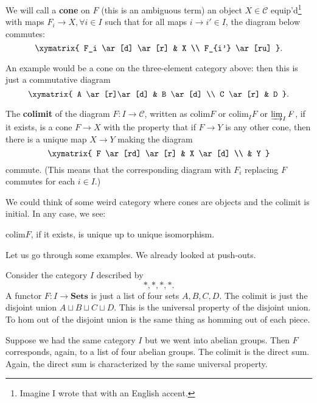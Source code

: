 We will call a \textbf{cone} on $F$ (this is an ambiguous term) an object $X
\in \mathcal{C}$ equip'd\footnote{Imagine I wrote that with an English
accent.} with maps $F_i \to X, \forall i \in I$ such that for all maps $i \to
i' \in I$, the diagram below commutes: \[ \xymatrix{ F_i \ar[d] \ar[r] & X \\
F_{i'} \ar[ru] }.\]

An example would be a cone on the three-element category above: then this is
just a commutative diagram \[ \xymatrix{ A \ar[r]\ar[d] & B \ar[d] \\ C \ar[r]
& D }.\]

\newcommand{\colim}{\mathrm{colim}}

\begin{definition} The \textbf{colimit} of the diagram $F: I \to \mathcal{C}$,
written as $\colim F$ or $\colim_I F $ or $\varinjlim_I F$, if it exists, is a
cone $F \to X$ with the property that if $F \to Y$ is any other cone, then
there is a unique map $X \to Y$ making the diagram \[ \xymatrix{ F \ar[rd]
\ar[r] & X \ar[d] \\ & Y }\] commute. (This means that the corresponding
diagram with $F_i$ replacing $F$ commutes for each $i \in I$.)
\end{definition}

We could think of some weird category where cones are objects and the colimit
is initial. In any case, we see:

\begin{proposition} $\colim F$, if it exists, is unique up to unique
isomorphism. \end{proposition}

Let us go through some examples. We already looked at push-outs.

\begin{example} Consider the category $I$ described by \[ \ast, \ast, \ast,
\ast. \] A functor $F: I \to \mathbf{Sets}$ is just a list of four sets $A, B,
C, D$. The colimit is just the disjoint union $A \sqcup B \sqcup C \sqcup D$.
This is the universal property of the disjoint union. To hom out of the
disjoint union is the same thing as homming out of each piece. \end{example}

\begin{example} Suppose we had the same category $I$ but we went into abelian
groups. Then $F$ corresponds, again, to a list of four abelian groups. The
colimit is the direct sum. Again, the direct sum is characterized by the same
universal property. \end{example}

